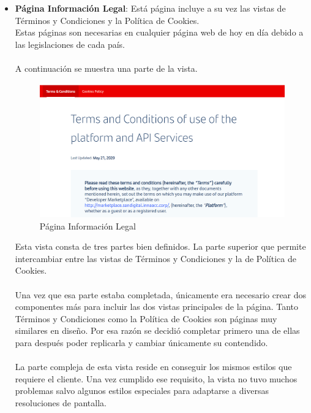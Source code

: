 \documentclass[a4paper,12pt]{article}
\begin{document}
\begin{itemize}
\begin{itemize}
        \item \textbf{Página Información Legal}: Está página incluye a su vez las vistas de Términos y Condiciones y la Política de Cookies.\\
        Estas páginas son necesarias en cualquier página web de hoy en día debido a las legislaciones de cada país.\\
        \\
        A continuación se muestra una parte de la vista.
        \begin{figure}[H]
            \centering
            \includegraphics[scale=0.5]{legal.PNG}
            \caption{Página Información Legal}
            \label{fig:my_label}
        \end{figure}
        
        Esta vista consta de tres partes bien definidos. La parte superior que permite intercambiar entre las vistas de Términos y Condiciones y la de Política de Cookies.\\
        \\
        Una vez que esa parte estaba completada, únicamente era necesario crear dos componentes más para incluir las dos vistas principales de la página. Tanto Términos y Condiciones como la Política de Cookies son páginas muy similares en diseño. Por esa razón se decidió completar primero una de ellas para después poder replicarla y cambiar únicamente su contendido.\\
        \\
        La parte compleja de esta vista reside en conseguir los mismos estilos que requiere el cliente. Una vez cumplido ese requisito, la vista no tuvo muchos problemas salvo algunos estilos especiales para adaptarse a diversas resoluciones de pantalla.
        

\end{itemize}
\end{itemize}
\end{document}
